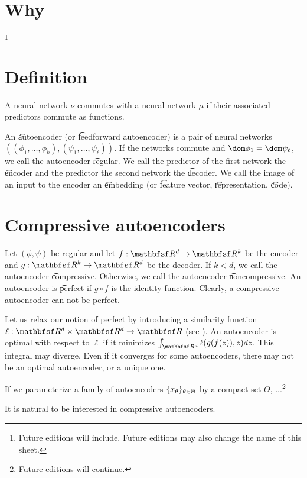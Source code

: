 

\section*{Why}
\footnote{Future editions will include. Future editions may also change the name of this sheet.}
\section*{Definition}

A neural network $\nu $ commutes with a neural network $\mu $ if their associated predictors commute as functions.

An \t{autoencoder} (or \t{feedforward autoencoder}) is a pair of neural networks $((\phi _1, \dots , \phi _k), (\psi _1, \dots , \psi _\ell ))$.
If the networks commute and $\dom \phi _1 = \dom \psi _\ell $, we call the autoencoder \t{regular}.
We call the predictor of the first network the \t{encoder} and the predictor the second network the \t{decoder}.
We call the image of an input to the encoder an \t{embedding} (or \t{feature vector}, \t{representation}, \t{code}).

\section*{Compressive autoencoders}

Let $(\phi , \psi )$ be regular and let $f: \R ^d \to \R ^k$ be the encoder and $g: \R ^k \to \R ^d$ be the decoder.
If $k < d$, we call the autoencoder \t{compressive}.
Otherwise, we call the autoencoder \t{noncompressive}.
An autoencoder is \t{perfect} if $g \circ f$ is the identity function.
Clearly, a compressive autoencoder can not be perfect.

Let us relax our notion of perfect by introducing a similarity function $\ell : \R ^d \times \R ^d \to \R $ (see ).
An autoencoder is optimal with respect to $\ell $ if it minimizes $\int_{\R ^d} \ell (g(f(z)), z) dz$.
This integral may diverge.
Even if it converges for some autoencoders, there may not be an optimal autoencoder, or a unique one.

If we parameterize a family of autoencoders $\{x_{\theta }\}_{\theta  \in \Theta }$ by a compact set $\Theta $, ...\footnote{Future editions will continue.}

It is natural to be interested in compressive autoencoders.

\blankpage